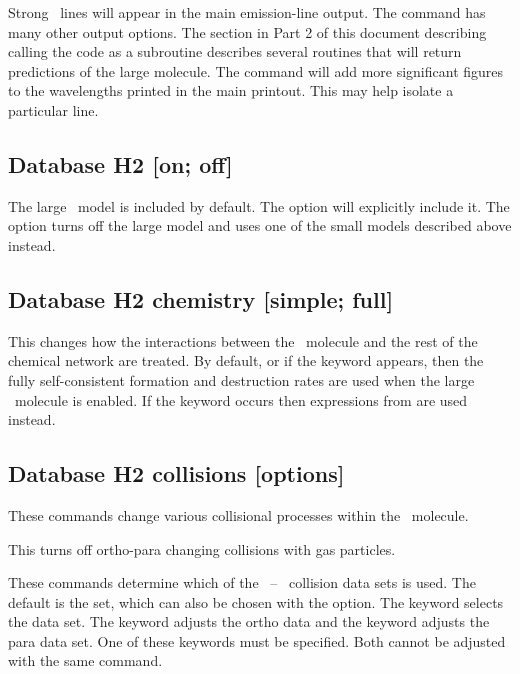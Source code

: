 Strong \htwo\ lines will appear in the main emission-line output.
The  command has many other output options.
The
section in Part 2 of this document describing calling the code as a
subroutine describes several routines that will return predictions of the
large molecule.
The  command
will add more significant figures to the wavelengths printed in the main
printout.
This may help isolate a particular line.

\subsection{Database H2 [on; off]}

The large \htwo\ model is included by default. 
The  option will explicitly include it.
The  option turns off the large model 
and uses one of the small models described above instead.

\subsection{Database H2 chemistry [simple; full]}

This changes how the interactions between the \htwo\ molecule
and the rest of the chemical network are treated.
By default, or if the keyword
appears, then the fully self-consistent formation and destruction rates
are used when the large \htwo\ molecule is enabled.
If the keyword
 occurs
then expressions from \citet{Tielens1985a} are used instead.

\subsection{Database H2 collisions [options]}
\label{sec:CommandH2CollisionsOptions}

These commands change various collisional processes within
the \htwo\ molecule.


This turns off
ortho-para changing
collisions with gas particles.



These commands determine which of the \htwo\ -- \htwo\ collision data
sets is used.
The default is the \citet{LeeH2H22008} set, which can also
be chosen with the  option.
The keyword  selects the
\citet{LeBourlot1999} data set.
The keyword  adjusts the ortho data and the
keyword  adjusts the para data set.
One of these keywords must be specified.  Both cannot be adjusted
with the same command.

